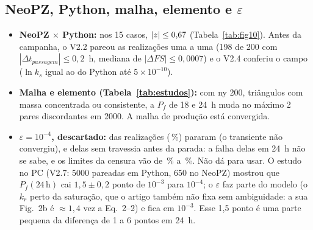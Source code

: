 \documentclass[11pt,a4paper]{article}
\begin{document}
\subsection{NeoPZ, Python, malha, elemento e $\varepsilon$}
\begin{itemize}
  \item \textbf{NeoPZ $\times$ Python:} nos 15 casos, $|z| \le 0{,}67$ (Tabela~\ref{tab:fig10}). Antes da campanha, o V2.2
    pareou as realizações uma a uma (198 de 200 com $|\Delta t_{passagem}| \le 0{,}2$~h, mediana de $|\Delta FS| \le
    0{,}0007$) e o V2.4 conferiu o campo ($\ln k_s$ igual ao do Python até $5\times10^{-10}$).
  \item \textbf{Malha e elemento (Tabela~\ref{tab:estudos}):} com ny 200, triângulos com massa concentrada ou consistente,
    a $P_f$ de 18 e 24~h muda no máximo 2 pares discordantes em 2000. A malha de produção está convergida.
  \item \textbf{$\varepsilon = 10^{-4}$, descartado:} \epsParou{} das \epsN{} realizações (\epsParouPct\,\%) pararam (o
    transiente não convergiu), e \epsCens{} delas sem travessia antes da parada: a falha delas em 24~h não se sabe, e os
    limites da censura vão de \epsLimLo\,\% a \epsLimHi\,\%. Não dá para usar. O estudo no PC (V2.7: 5000 pareadas em
    Python, 650 no NeoPZ) mostrou que $P_f(24\,\mathrm{h})$ cai $1{,}5 \pm 0{,}2$ ponto de $10^{-3}$ para $10^{-4}$; o
    $\varepsilon$ faz parte do modelo (o $k_r$ perto da saturação, que o artigo também não fixa sem ambiguidade: a sua
    Fig.~2b é $\approx 1{,}4$ vez a Eq.~2--2) e fica em $10^{-3}$. Esse 1,5 ponto é uma parte pequena da diferença de 1 a 6
    pontos em 24~h.
\end{itemize}

\end{document}
